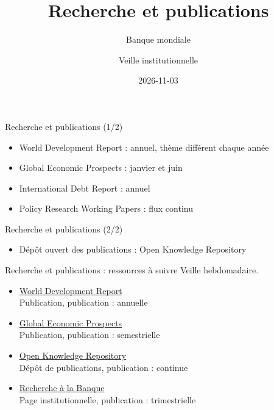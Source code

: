 \documentclass[aspectratio=169,11pt]{beamer}
\title{Recherche et publications}
\subtitle{Banque mondiale}
\author{Veille institutionnelle}
\date{2026-11-03}
\begin{document}
\begin{frame}\titlepage\end{frame}

\begin{frame}{Recherche et publications (1/2)}
\begin{itemize}
\item World Development Report : annuel, thème différent chaque année
\item Global Economic Prospects : janvier et juin
\item International Debt Report : annuel
\item Policy Research Working Papers : flux continu
\end{itemize}
\end{frame}

\begin{frame}{Recherche et publications (2/2)}
\begin{itemize}
\item Dépôt ouvert des publications : Open Knowledge Repository
\end{itemize}
\end{frame}

\begin{frame}{Recherche et publications : ressources à suivre}
\small
Veille hebdomadaire.
\begin{itemize}
\item \href{https://www.worldbank.org/en/publication/wdr}{World Development Report}\\{\footnotesize Publication, publication : annuelle}
\item \href{https://www.worldbank.org/en/publication/global-economic-prospects}{Global Economic Prospects}\\{\footnotesize Publication, publication : semestrielle}
\item \href{https://openknowledge.worldbank.org}{Open Knowledge Repository}\\{\footnotesize Dépôt de publications, publication : continue}
\item \href{https://www.worldbank.org/en/research}{Recherche à la Banque}\\{\footnotesize Page institutionnelle, publication : trimestrielle}
\end{itemize}
\end{frame}
\end{document}
